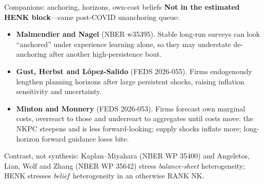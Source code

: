 \documentclass[11pt,aspectratio=169]{beamer}
\begin{document}
\begin{frame}{Companions: anchoring, horizons, own-cost beliefs}
  \textbf{Not in the estimated HENK block}---same post-COVID unanchoring queue:
  \begin{itemize}
    \item \textbf{Malmendier and Nagel} (NBER w35395).
          Stable long-run surveys can look ``anchored'' under experience
          learning alone, so they may understate de-anchoring after another
          high-persistence bout.
    \item \textbf{Gust, Herbst and L\'opez-Salido} (FEDS 2026-055).
          Firms endogenously lengthen planning horizons after large persistent
          shocks, raising inflation sensitivity and uncertainty.
    \item \textbf{Minton and Monnery} (FEDS 2026-053).
          Firms forecast own marginal costs, overreact to those and underreact
          to aggregates until costs move: the NKPC steepens and is less
          forward-looking; supply shocks inflate more; long-horizon forward
          guidance loses bite.
  \end{itemize}
  {\scriptsize Contrast, not synthesis: Kaplan--Miyahara (NBER WP 35400) and
  Angeletos, Lian, Wolf and Zhang (NBER WP 35642) stress \emph{balance-sheet}
  heterogeneity; HENK stresses \emph{belief}~heterogeneity in an otherwise RANK NK.}
\end{frame}

\end{document}
